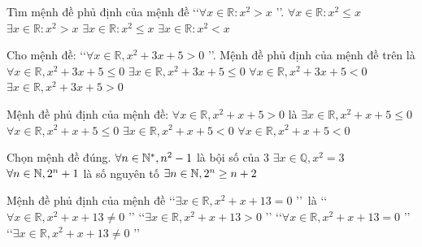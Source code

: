 \begin{ex}%
	Tìm mệnh đề phủ định của mệnh đề \lq\lq  $\forall x \in \mathbb{R}\colon x^2>x$ \rq\rq.
	 \choice
		{$\forall  x \in \mathbb{R}\colon x^2 \leq x$}
		{$\exists x \in \mathbb{R}\colon  x^2>x$}
		{\True  $\exists x \in \mathbb{R}\colon x^2 \leq x$}
		{$\exists  x \in \mathbb{R}\colon x^2<x$}
\end{ex}

\begin{ex}%
	Cho mệnh đề: \lq\lq  $\forall x \in \mathbb{R}, x^2+3x+5>0$ \rq\rq. Mệnh đề phủ định của mệnh đề trên là
	 \choice
		{$\forall x \in \mathbb{R}, x^2+3x+5 \leq  0$}
		{\True $\exists x  \in \mathbb{R}, x^2+3x+5 \leq 0$}
		{$\forall x \in \mathbb{R}, x^2+3x+5<0$} 
		{$\exists x  \in \mathbb{R}, x^2+3x+5>0$}
\end{ex}

\begin{ex}%
	Mệnh đề  phủ định của mệnh đề: $\forall x \in \mathbb{R}, x^2+x+5 > 0$ là
	\choice 
		{\True $\exists x  \in \mathbb{R}, x^2+x+5 \leq 0$}
		{$\forall x \in \mathbb{R}, x^2+x+5 \leq  0$}
		{$\exists x \in  \mathbb{R}, x^2+x+5<0$}
		 {$\forall x \in \mathbb{R}, x^2+x+5<0$}
\end{ex}

\begin{ex}%
	Chọn mệnh đề đúng. 
	\choice 
		{$\forall n\in {\bf \mathbb{N}}^{*}, n^2-1$ là bội số  của $3$}
		{$\exists x\in \mathbb{Q},  x^2=3$}
		{$\forall n\in {\bf \mathbb{N}}, 2^n+1$ là số nguyên tố} 
		{\True $\exists n\in {\bf  \mathbb{N}}, 2^n \ge n+2$}
\end{ex}

\begin{ex}%
	Mệnh đề phủ định  của mệnh đề \lq\lq $\exists x \in \mathbb{R}, x^2+x+13=0$ \rq\rq\, là
	\choice 
		{\True \lq\lq $\forall x \in  \mathbb{R}, x^2+x+13 \neq 0$ \rq\rq}
		{\lq\lq  $\exists x \in \mathbb{R}, x^2+x+13>0$ \rq\rq}
		 {\lq\lq $\forall x \in \mathbb{R}, x^2+x+13=0$ \rq\rq}
		{\lq\lq $\exists x \in \mathbb{R},  x^2+x+13 \neq 0$ \rq\rq}
\end{ex}

